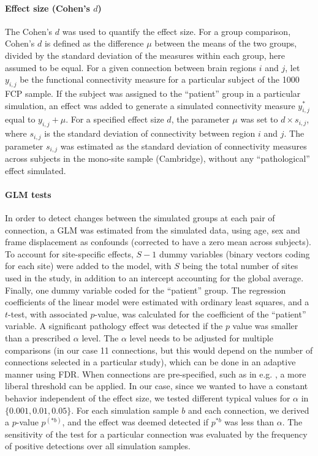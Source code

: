 \documentclass[authoryear]{elsarticle}
\begin{document}
\paragraph{Effect size (Cohen's $d$)}
The Cohen's $d$ was used to quantify the effect size. For a group comparison, Cohen's $d$ is defined as the difference $\mu$ between the means of the two groups, divided by the standard deviation of the measures within each group, here assumed to be equal. For a given connection between brain regions $i$ and $j$, let $y_{i,j}$ be the functional connectivity measure for a particular subject of the 1000 FCP sample. If the subject was assigned to the ``patient'' group in a particular simulation, an effect was added to generate a simulated connectivity measure $y_{i,j}^*$ equal to $y_{i,j} + \mu$. For a specified effect size $d$, the parameter $\mu$ was set to $d\times s_{i,j}$, where $s_{i,j}$ is the standard deviation of connectivity between region $i$ and $j$. The parameter $s_{i,j}$ was estimated as the standard deviation of connectivity measures across subjects in the mono-site sample (Cambridge), without any ``pathological'' effect simulated.

\paragraph{GLM tests}
In order to detect changes between the simulated groups at each pair of connection, a GLM was estimated from the simulated data, using age, sex and frame displacement as confounds (corrected to have a zero mean across subjects). To account for site-specific effects, $S-1$ dummy variables (binary vectors coding for each site) were added to the model, with $S$ being the total number of sites used in the study, in addition to an intercept accounting for the global average. Finally, one dummy variable coded for the ``patient'' group. The regression coefficients of the linear model were estimated with ordinary least squares, and a $t$-test, with associated $p$-value, was calculated for the coefficient of the ``patient'' variable. A significant pathology effect was detected if the $p$ value was smaller than a prescribed $\alpha$ level. The $\alpha$ level needs to be adjusted for multiple comparisons (in our case 11 connections, but this would depend on the number of connections selected in a particular study), which can be done in an adaptive manner using FDR. When connections are pre-specified, such as in e.g. \cite{Wang2012}, a more liberal threshold can be applied. In our case, since we wanted to have a constant behavior independent of the effect size, we tested different typical values for $\alpha$ in $\{0.001,0.01,0.05\}$. For each simulation sample $b$ and each connection, we derived a $p$-value $p^{(*b)}$, and the effect was deemed detected if $p^{*b}$ was less than $\alpha$. The sensitivity of the test for a particular connection was evaluated by the frequency of positive detections over all simulation samples.
\end{document}
